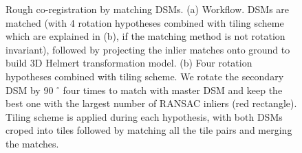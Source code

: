 \begin{figure}[htbp]
    \begin{center}
        \caption{Rough co-registration by matching DSMs. (a) Workflow. DSMs are matched (with 4 rotation hypotheses combined with tiling scheme which are explained in (b), if the matching method is not rotation invariant), followed by projecting the inlier matches onto ground to build 3D Helmert transformation model. (b) Four rotation hypotheses combined with tiling scheme. We rotate the secondary DSM by 90 $^\circ$ four times to match with master DSM and keep the best one with the largest number of RANSAC inliers (red rectangle). Tiling scheme is applied during each hypothesis, with both DSMs croped into tiles followed by matching all the tile pairs and merging the matches.}
        \label{WorkflowDSM}
    \end{center}
\end{figure}

